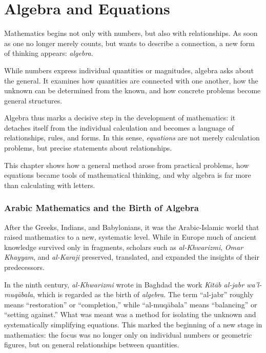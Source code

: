 \chapter{Algebra and Equations}
\label{chap:III_algebra}

Mathematics begins not only with numbers, but also with relationships.
As soon as one no longer merely counts, but wants to describe a connection,
a new form of thinking appears:
\emph{algebra}.

While numbers express individual quantities or magnitudes,
algebra asks about the general.
It examines how quantities are connected with one another,
how the unknown can be determined from the known,
and how concrete problems become general structures.

Algebra thus marks a decisive step
in the development of mathematics:
it detaches itself from the individual calculation
and becomes a language of relationships, rules, and forms.
In this sense, \emph{equations}
are not merely calculation problems,
but precise statements about relationships.

This chapter shows
how a general method arose from practical problems,
how equations became tools of mathematical thinking,
and why algebra is far more
than calculating with letters.

\subsection{Arabic Mathematics and the Birth of Algebra}
\label{sec:3.1_arabic_mathematics}

After the Greeks, Indians, and Babylonians,
it was the Arabic-Islamic world
that raised mathematics to a new, systematic level.
While in Europe much of ancient knowledge survived only in fragments,
scholars such as
\emph{al-Khwarizmi},
\emph{Omar Khayyam}, and
\emph{al-Karaji}
preserved, translated, and expanded the insights of their predecessors.

In the ninth century, \emph{al-Khwarizmi} wrote in Baghdad
the work
\emph{Kitāb al-jabr wa’l-muqābala},
which is regarded as the birth of \emph{algebra}.
The term ``al-jabr'' roughly means ``restoration'' or ``completion,''
while ``al-muqābala'' means ``balancing'' or ``setting against.''
What was meant was a method for isolating the unknown
and systematically simplifying equations.
This marked the beginning of a new stage in mathematics:
the focus was no longer only on individual numbers or geometric figures,
but on general relationships between quantities.

